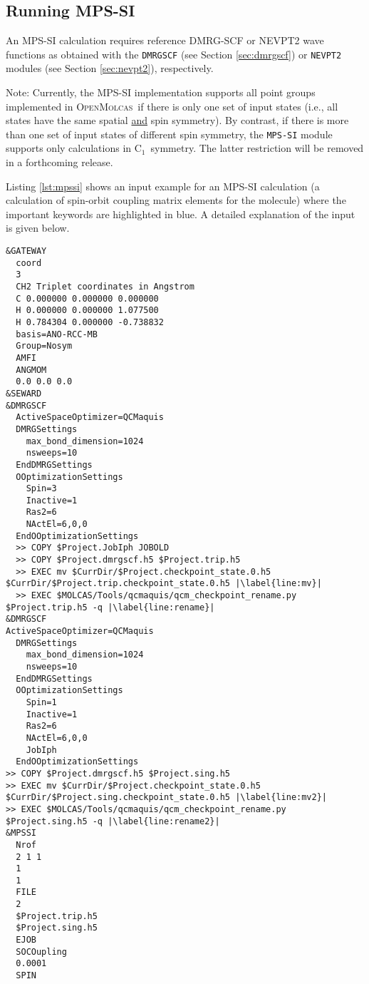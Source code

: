 \documentclass[bibliography=totoc,12pt,a4paper]{scrartcl}
\newcommand{\mol}{\textsc{OpenMolcas}}
\newcommand{\hostp}{\mol}
\newcommand{\kwd}[1]{\texttt{#1}}
\begin{document}
\subsection{Running MPS-SI}\label{sec:run-mpssi}

An MPS-SI calculation requires reference DMRG-SCF or NEVPT2
wave functions as obtained with the \kwd{DMRGSCF} (see Section \ref{sec:dmrgscf}) or \kwd{NEVPT2} modules (see Section \ref{sec:nevpt2}), respectively.
\begin{framed}
 \noindent Note: Currently, the MPS-SI implementation supports all point groups implemented in \hostp\
 if there is only one set of input states (i.e., all states have the same spatial \underline{and} spin symmetry). By contrast, if there is more than one set of input states of different spin symmetry, the \kwd{MPS-SI} module
 supports only calculations in C$_1$\ symmetry. The latter restriction will be removed in a forthcoming release.
\end{framed}
Listing \ref{lst:mpssi} shows an input example for an MPS-SI calculation (a calculation of spin-orbit coupling matrix elements for the  molecule) where
the important keywords are highlighted in blue. A detailed explanation of the input is given below.

\begin{lstlisting}[language=molcas,caption={(File \texttt{007.input} in the QCMaquis test directory) Input example for a one-shot MPS-SI spin-orbit calculation (Singlet and triplet state, \ch{CH2} molecule, 6 electrons in 6 orbitals, C1 symmetry).},label=lst:mpssi]
&GATEWAY
  coord
  3
  CH2 Triplet coordinates in Angstrom
  C 0.000000 0.000000 0.000000
  H 0.000000 0.000000 1.077500
  H 0.784304 0.000000 -0.738832
  basis=ANO-RCC-MB
  Group=Nosym
  AMFI
  ANGMOM
  0.0 0.0 0.0
&SEWARD
&DMRGSCF
  ActiveSpaceOptimizer=QCMaquis
  DMRGSettings
    max_bond_dimension=1024
    nsweeps=10
  EndDMRGSettings
  OOptimizationSettings
    Spin=3
    Inactive=1
    Ras2=6
    NActEl=6,0,0
  EndOOptimizationSettings
  >> COPY $Project.JobIph JOBOLD
  >> COPY $Project.dmrgscf.h5 $Project.trip.h5
  >> EXEC mv $CurrDir/$Project.checkpoint_state.0.h5 $CurrDir/$Project.trip.checkpoint_state.0.h5 |\label{line:mv}|
  >> EXEC $MOLCAS/Tools/qcmaquis/qcm_checkpoint_rename.py $Project.trip.h5 -q |\label{line:rename}|
&DMRGSCF
ActiveSpaceOptimizer=QCMaquis
  DMRGSettings
    max_bond_dimension=1024
    nsweeps=10
  EndDMRGSettings
  OOptimizationSettings
    Spin=1
    Inactive=1
    Ras2=6
    NActEl=6,0,0
    JobIph
  EndOOptimizationSettings
>> COPY $Project.dmrgscf.h5 $Project.sing.h5
>> EXEC mv $CurrDir/$Project.checkpoint_state.0.h5 $CurrDir/$Project.sing.checkpoint_state.0.h5 |\label{line:mv2}|
>> EXEC $MOLCAS/Tools/qcmaquis/qcm_checkpoint_rename.py $Project.sing.h5 -q |\label{line:rename2}|
&MPSSI
  Nrof
  2 1 1
  1
  1
  FILE
  2
  $Project.trip.h5
  $Project.sing.h5
  EJOB
  SOCOupling
  0.0001
  SPIN
\end{lstlisting}
\end{document}
